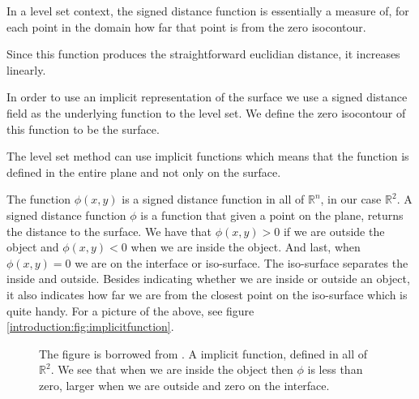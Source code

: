 In a level set context, the signed distance function is essentially a
measure of, for each point in the domain how far that point is from
the zero isocontour.

Since this function produces the straightforward euclidian distance,
it increases linearly. 

In order to use an implicit representation of the surface we use a
signed distance field as the underlying function to the level set. We
define the zero isocontour of this function to be the surface.

The level set method can use implicit functions which means that the
function is defined in the entire plane and not only on the surface.

The function $\phi(x,y)$ is a signed distance function in all of
$\mathbb{R}^{n}$, in our case $\mathbb{R}^{2}$. A signed distance
function $\phi$ is a function that given a point on the plane, returns
the distance to the surface. We have that $\phi(x,y) > 0$ if we are
outside the object and $\phi(x,y) < 0$ when we are inside the object.
And last, when $\phi(x,y) = 0$ we are on the interface or iso-surface.
The iso-surface separates the inside and outside.  Besides indicating
whether we are inside or outside an object, it also indicates how far
we are from the closest point on the iso-surface which is quite
handy. For a picture of the above, see figure
\vref{introduction:fig:implicitfunction}.


\begin{figure*}[!htb]
  \centering
  \caption{The figure is borrowed from . A
    implicit function, defined in all of $\mathbb{R}^{2}$. We see that
    when we are inside the object then $\phi$ is less than zero,
    larger when we are outside and zero on the interface.}
  \label{introduction:fig:implicitfunction}
\end{figure*}


